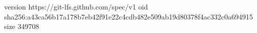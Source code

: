 version https://git-lfs.github.com/spec/v1
oid sha256:a43ca56b17a178b7eb42f91e22c4cdb482e509ab19d80378f4ac332c0a694915
size 349708
